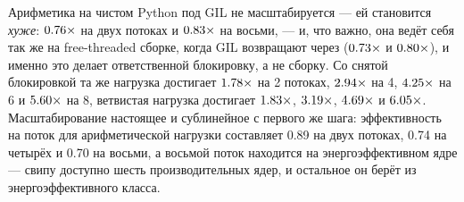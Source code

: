 Арифметика на чистом Python под GIL не масштабируется --- ей становится \emph{хуже}: $\meas{ratio:b4_threads-gil:py_arith/gil/T1_control|b4_threads-gil:py_arith/gil/T2}{0.76}\times$ на
двух потоках и $\meas{ratio:b4_threads-gil:py_arith/gil/T1_control|b4_threads-gil:py_arith/gil/T8}{0.83}\times$ на восьми, --- и, что важно, она ведёт себя так же на free-threaded
сборке, когда GIL возвращают через  ($\meas{ratio:b4_threads-ft_gil:py_arith/ft_gil/T1_control|b4_threads-ft_gil:py_arith/ft_gil/T2}{0.73}\times$ и $\meas{ratio:b4_threads-ft_gil:py_arith/ft_gil/T1_control|b4_threads-ft_gil:py_arith/ft_gil/T8}{0.80}\times$), и именно это
делает ответственной блокировку, а не сборку. Со снятой блокировкой та же нагрузка достигает
$\meas{ratio:b4_threads-ft:py_arith/ft/T1_control|b4_threads-ft:py_arith/ft/T2}{1.78}\times$ на 2 потоках, $\meas{ratio:b4_threads-ft:py_arith/ft/T1_control|b4_threads-ft:py_arith/ft/T4}{2.94}\times$ на 4, $\meas{ratio:b4_threads-ft:py_arith/ft/T1_control|b4_threads-ft:py_arith/ft/T6}{4.25}\times$ на 6 и $\meas{ratio:b4_threads-ft:py_arith/ft/T1_control|b4_threads-ft:py_arith/ft/T8}{5.60}\times$ на 8, ветвистая
нагрузка достигает $\meas{ratio:b4_threads-ft:py_branchy/ft/T1|b4_threads-ft:py_branchy/ft/T2}{1.83}\times$, $\meas{ratio:b4_threads-ft:py_branchy/ft/T1|b4_threads-ft:py_branchy/ft/T4}{3.19}\times$, $\meas{ratio:b4_threads-ft:py_branchy/ft/T1|b4_threads-ft:py_branchy/ft/T6}{4.69}\times$ и $\meas{ratio:b4_threads-ft:py_branchy/ft/T1|b4_threads-ft:py_branchy/ft/T8}{6.05}\times$. Масштабирование
настоящее и сублинейное с первого же шага: эффективность на поток для арифметической нагрузки
составляет 0.89 на двух потоках, 0.74 на четырёх и 0.70 на восьми, а восьмой поток находится на
энергоэффективном ядре --- свипу доступно шесть производительных ядер, и остальное он берёт из
энергоэффективного класса.

